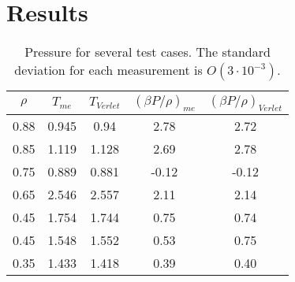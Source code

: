 \section{Results}


\begin{table}
\centering
\caption{Pressure for several test cases. The standard deviation for each
measurement is $O(3 \cdot 10^{-3})$.} \begin{tabular}{|c|c|c|c|c|} \hline
$\rho$&$T_{me}$&$T_{Verlet}$&$(\beta P/\rho)_{me}$&$(\beta P/\rho)_{Verlet}$ \\
\hline
0.88&0.945&0.94&2.78&2.72\\ \hline
0.85&1.119&1.128&2.69&2.78\\ \hline
0.75&0.889&0.881&-0.12&-0.12\\ \hline
0.65&2.546&2.557&2.11&2.14\\ \hline
0.45&1.754&1.744&0.75&0.74\\ \hline
0.45&1.548&1.552&0.53&0.75\\ \hline
0.35&1.433&1.418&0.39&0.40\\ \hline
\end{tabular}
\label{tab:pressure}
\end{table}


